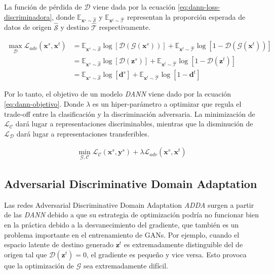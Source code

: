 La función de pérdida de $\mathcal{D}$ viene dada por la ecuación \ref{eq:dann-loss-discriminadora}, donde
$\mathbb{E}_{\mathbf{x}^s \sim \mathcal{\hat{S}}}$ y $\mathbb{E}_{\mathbf{x}^t \sim \mathcal{\hat{T}}}$ representan la
proporción esperada de datos de origen $\mathcal{\hat{S}}$ y destino $\mathcal{\hat{T}}$ respectivamente.

\begin{align}
    \max_{\mathcal{D}} \mathcal{L}_{adv}(\mathbf{x}^s, \mathbf{x}^t) & = \mathbb{E}_{\mathbf{x}^s \sim \mathcal{\hat{S}}}\log[\mathcal{D}(\mathcal{G}(\mathbf{x}^s))] + \mathbb{E}_{\mathbf{x}^t \sim \mathcal{\hat{T}}}\log[1-\mathcal{D}(\mathcal{G}(\mathbf{x}^t))] \nonumber \\
                                                                     & = \mathbb{E}_{\mathbf{x}^s \sim \mathcal{\hat{S}}}\log[\mathcal{D}(\mathbf{z}^s)] + \mathbb{E}_{\mathbf{x}^t \sim \mathcal{\hat{T}}}\log[1-\mathcal{D}(\mathbf{z}^t)] \nonumber                           \\
                                                                     & = \mathbb{E}_{\mathbf{x}^s \sim \mathcal{\hat{S}}}\log[\mathbf{d}^s] + \mathbb{E}_{\mathbf{x}^t \sim \mathcal{\hat{T}}}\log[1-\mathbf{d}^t]
    \label{eq:dann-loss-discriminadora}
\end{align}

Por lo tanto, el objetivo de un modelo {\it DANN} viene dado por la ecuación \ref{eq:dann-objetivo}. Donde $\lambda$ es
un hiper-parámetro a optimizar que regula el trade-off entre la clasificación y la discriminación adversaria. La
minimización de $\mathcal{L}_\mathcal{C}$ dará lugar a representaciones discriminables, mientras que la disminución de
$\mathcal{L}_\mathcal{D}$ dará lugar a representaciones transferibles.

\begin{align}
    \min_{\mathcal{G},\mathcal{C}} \mathcal{L}_\mathcal{C}(\mathbf{x}^s, \mathbf{y}^s) + \lambda \mathcal{L}_{adv}(\mathbf{x}^s, \mathbf{x}^t)
    \label{eq:dann-objetivo}
\end{align}

\subsection{Adversarial Discriminative Domain Adaptation}
Las redes Adversarial Discriminative Domain Adaptation {\it ADDA} \parencite{tzeng2017adversarial} surgen a partir de las {\it DANN} debido a que su estrategia de optimización podría no
funcionar bien en la práctica debido a la desvanecimiento del gradiente, que también es un problema importante en el
entrenamiento de GANs. Por ejemplo, cuando el espacio latente de destino generado $\mathbf{z}^t$ es extremadamente
distinguible del de origen tal que $\mathcal{D}(\mathbf{z}^t)=0$, el gradiente es pequeño y vice versa. Esto provoca
que la optimización de $\mathcal{G}$ sea extremadamente difícil.

